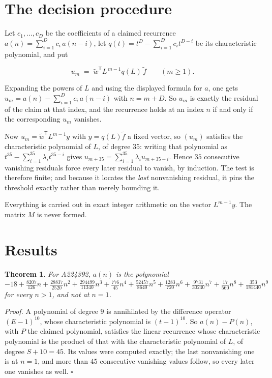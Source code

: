 \documentclass[11pt]{article}
\newtheorem{theorem}{Theorem}
\theoremstyle{definition}
\begin{document}
\section{The decision procedure}

Let $c_1,\dots,c_D$ be the coefficients of a claimed recurrence $a(n) = \sum_{i=1}^{D} c_i\,a(n-i)$, let $q(t) = t^{D} - \sum_{i=1}^{D} c_i t^{D-i}$ be its characteristic polynomial, and put

\[u_m \;=\; \tilde w^{\mathsf T} L^{\,m-1} q(L)\,\tilde f \qquad (m \ge 1).\]

Expanding the powers of $L$ and using the displayed formula for $a$, one gets $u_m = a(n) - \sum_{i=1}^{D} c_i\,a(n-i)$ with $n = m + D$. So $u_m$ is exactly the residual of the claim at that index, and the recurrence holds at an index $n$ if and only if the corresponding $u_m$ vanishes.

Now $u_m = \tilde w^{\mathsf T} L^{m-1} y$ with $y = q(L)\tilde f$ a fixed vector, so $(u_m)$ satisfies the characteristic polynomial of $L$, of degree $35$: writing that polynomial as $t^{35} - \sum_{i=1}^{35} \lambda_i t^{35-i}$ gives $u_{m+35} = \sum_{i=1}^{35} \lambda_i u_{m+35-i}$. Hence $35$ consecutive vanishing residuals force every later residual to vanish, by induction. The test is therefore finite; and because it locates the {\itshape last} nonvanishing residual, it pins the threshold exactly rather than merely bounding it.

Everything is carried out in exact integer arithmetic on the vector $L^{m-1}y$. The matrix $M$ is never formed.

\section{Results}

\begin{theorem} For A224392, $a(n)$ is the polynomial $-18 + \frac{8207}{126}n + \frac{28837}{2520}n^{2} + \frac{294499}{11340}n^{3} + \frac{776}{45}n^{4} + \frac{52457}{8640}n^{5} + \frac{1283}{720}n^{6} + \frac{9731}{30240}n^{7} + \frac{17}{560}n^{8} + \frac{353}{181440}n^{9}$ for every $n > 1$, and not at $n = 1$.\end{theorem}

{\itshape Proof.} A polynomial of degree $9$ is annihilated by the difference operator $(E-1)^{10}$, whose characteristic polynomial is $(t-1)^{10}$. So $a(n) - P(n)$, with $P$ the claimed polynomial, satisfies the linear recurrence whose characteristic polynomial is the product of that with the characteristic polynomial of $L$, of degree $S + 10 = 45$. Its values were computed exactly; the last nonvanishing one is at $n = 1$, and more than $45$ consecutive vanishing values follow, so every later one vanishes as well. $\square$
\end{document}
